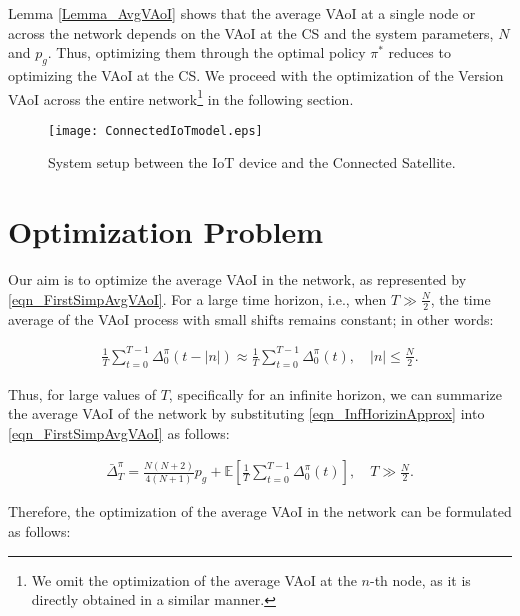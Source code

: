 \documentclass[lettersize,journal]{IEEEtran}
\begin{document}
    Lemma \ref{Lemma_AvgVAoI} shows that the average VAoI at a single node or across the network depends on the VAoI at the CS and the system parameters, $N$ and $p_g$. Thus, optimizing them through the optimal policy $\pi^\ast$ reduces to optimizing the VAoI at the CS. We proceed with the optimization of the Version VAoI across the entire network\footnote{We omit the optimization of the average VAoI at the $n$-th node, as it is directly obtained in a similar manner.} in the following section. 

    \begin{figure}[t!]
		\centering
		\texttt{[image: ConnectedIoTmodel.eps]}
        \vspace{6pt}
		\caption{System setup between the IoT device and the Connected Satellite.}
        \vspace{-8pt}
		\label{fig_SysModel_Single}
    \end{figure}

    \section{Optimization Problem}
    \label{sec_ProbFormulation}
    
    Our aim is to optimize the average VAoI in the network, as represented by \eqref{eqn_FirstSimpAvgVAoI}. For a large time horizon, i.e., when $T \gg \frac{N}{2}$, the time average of the VAoI process with small shifts remains constant; in other words:

    \begin{align}
        \label{eqn_InfHorizinApprox}
        \frac{1}{T} \sum_{t=0}^{T-1}  \Delta_0^\pi(t-|n|) \approx \frac{1}{T} \sum_{t=0}^{T-1}  \Delta_0^\pi(t), \quad |n| \leq \frac{N}{2}.
    \end{align}

   Thus, for large values of $T$, specifically for an infinite horizon, we can summarize the average VAoI of the network by substituting \eqref{eqn_InfHorizinApprox} into \eqref{eqn_FirstSimpAvgVAoI} as follows:

    
    \begin{align}
        \label{eqn_FirstSimpAvgVAoIapprox}
        \bar{\Delta}_T^\pi = \frac{N(N+2)}{4(N+1)}p_g + \mathbb{E} \left[ \frac{1}{T} \sum_{t=0}^{T-1}  \Delta_0^\pi(t) \right], \quad T \gg \frac{N}{2}.
    \end{align}

    Therefore, the optimization of the average VAoI in the network can be formulated as follows:
\end{document}
